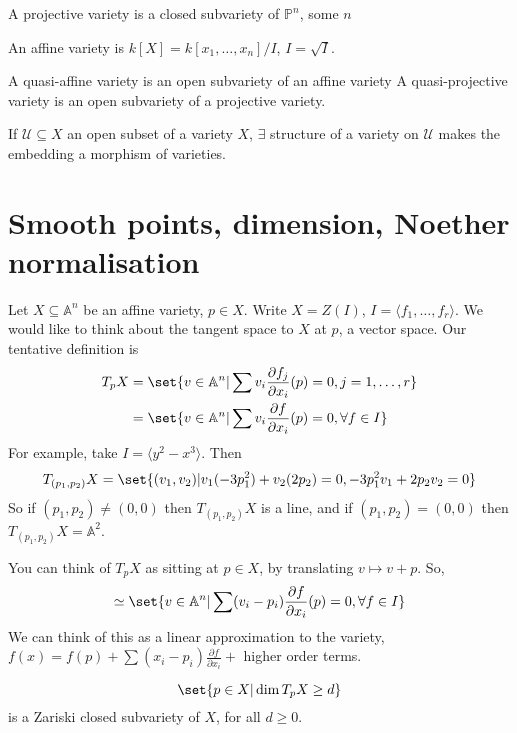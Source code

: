 \documentclass{article}
\newcommand{\A}{\mathbb{A}}
\newcommand{\proj}{\mathbb{P}}
\begin{document}
\begin{defi}
    A projective variety is a closed subvariety of $\proj^n$, some $n$
\end{defi}
An affine variety is $k[X] = k[x_1, \dotsc, x_n]/I$, $I = \sqrt{I}$.
\begin{defi}
    A quasi-affine variety is an open subvariety of an affine variety
    A quasi-projective variety is an open subvariety of a projective variety.
\end{defi}
\begin{ex}
    If $\mathcal{U} \subseteq X$ an open subset of a variety $X$, $\exists$ structure of a variety on $\mathcal{U}$ makes the embedding a morphism of varieties.
\end{ex}

\section{Smooth points, dimension, Noether normalisation}
Let $X \subseteq \A^n$ be an affine variety, $p \in X$. Write $X = Z(I)$, $I = \langle f_1, \dotsc, f_r \rangle$.
We would like to think about the tangent space to $X$ at $p$, a vector space.
Our tentative definition is
\begin{align*}
    T_p X &= \set{v \in \A^n | \sum v_i \frac{\partial f_j}{\partial x_i}(p) = 0, j = 1,\dotsc, r} \\
    &= \set{v \in \A^n | \sum v_i \frac{\partial f}{\partial x_i}(p) = 0, \forall f \in I}
\end{align*}
For example, take $I = \langle y^2 - x^3 \rangle$.
Then
\begin{equation*}
    T_{(p_1, p_2)} X = \set{(v_1, v_2) | v_1 (-3p_1^2) + v_2 (2 p_2) = 0, -3p_1^2 v_1 + 2p_2 v_2 = 0}
\end{equation*}
So if $(p_1, p_2) \neq (0, 0)$ then $T_{(p_1, p_2)} X$ is a line, and if $(p_1, p_2) = (0, 0)$ then $T_{(p_1, p_2)} X = \A^2$.
\begin{remark}
    You can think of $T_p X$ as sitting at $p \in X$, by translating $v \mapsto v + p$.
    So,
    \begin{equation*}
        \simeq \set{v \in \A^n | \sum (v_i - p_i) \frac{\partial f}{\partial x_i} (p) = 0, \forall f \in I}
    \end{equation*}
    We can think of this as a linear approximation to the variety, $f(x) = f(p) + \sum (x_i - p_i) \frac{\partial f}{\partial x_i} + $ higher order terms.
\end{remark}
\begin{lemma}
    \begin{equation*}
        \set{p \in X | \dim T_p X \geq d}
    \end{equation*}
    is a Zariski closed subvariety of $X$, for all $d \geq 0$.
\end{lemma}
\end{document}
